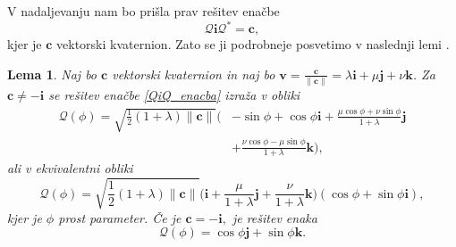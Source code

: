 \documentclass[12pt,a4paper,twoside]{article}
\theoremstyle{definition} %
\theoremstyle{plain} %
\newtheorem{lema}[definicija]{Lema}
\theoremstyle{primerstyle}
\numberwithin{equation}{section}  %
\newcommand{\cV}{\mathbf{c}}
\newcommand{\iV}{\mathbf{i}}
\newcommand{\jV}{\mathbf{j}}
\newcommand{\kV}{\mathbf{k}}
\newcommand{\vV}{\mathbf{v}}
\newcommand{\QQ}{\mathcal{Q}}
\begin{document}
V nadaljevanju nam bo prišla prav rešitev enačbe
\begin{equation}
	\label{QiQ_enacba}
	\QQ\iV\QQ^*=\cV,
\end{equation}
kjer je $\cV$ vektorski kvaternion. Zato se ji podrobneje posvetimo v naslednji lemi \cite[poglavje 3.2]{farouki2002hermite}.
\begin{lema}
	\label{QiQ_enacba_lema}
	Naj bo $\cV$ vektorski kvaternion in naj bo $\vV=\frac{\cV}{\lVert\cV\rVert}=\lambda\iV+\mu\jV+\nu\kV$. Za $\cV\neq-\iV$ se rešitev enačbe \eqref{QiQ_enacba} izraža v obliki
	\begin{align}
		\QQ(\phi)=\sqrt{\frac{1}{2}(1+\lambda)\lVert\cV\rVert}\Big(&-\sin\phi+\cos\phi\iV+\frac{\mu\cos\phi+\nu\sin\phi}{1+\lambda}\jV\nonumber\\
		&+\frac{\nu\cos\phi-\mu\sin\phi}{1+\lambda}\kV\Big),\label{QiQ_enacba_resitev}
	\end{align}
	ali v ekvivalentni obliki
	\begin{equation}
		\label{QiQ_enacba_resitev2}
		\QQ(\phi)=\sqrt{\frac{1}{2}(1+\lambda)\lVert\cV\rVert}\Big(\iV+\frac{\mu}{1+\lambda}\jV+\frac{\nu}{1+\lambda}\kV\Big)(\cos\phi+\sin\phi\iV),
	\end{equation}
	kjer je $\phi$ prost parameter. Če je $\cV=-\iV,$ je rešitev enaka
	\begin{equation}
		\label{QiQ_enacba_resitev3}
		\QQ(\phi)=\cos\phi\jV+\sin\phi\kV.
	\end{equation}
\end{lema}
\end{document}
